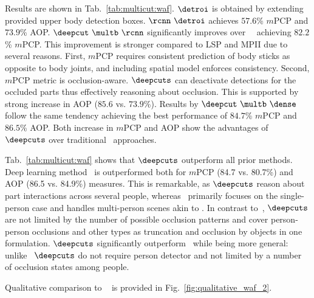

 Results are shown in
Tab.~\ref{tab:multicut:waf}. $\detroi$ is obtained by extending
provided upper body detection boxes.
$\rcnn~\detroi$ achieves $57.6$\% $m$PCP and $73.9$\%
AOP. $\deepcut~\multb~\rcnn$ significantly improves over
\rcnn~\detroi~achieving $82.2$\% $m$PCP. This improvement is stronger
compared to LSP and MPII due to several reasons. First, $m$PCP
requires consistent prediction of body sticks as opposite to body
joints, and including spatial model enforces consistency. Second,
$m$PCP metric is occlusion-aware. $\deepcuts$ can deactivate
detections for the occluded parts thus effectively reasoning about
occlusion. This is supported by strong increase in AOP ($85.6$
vs. $73.9$\%). Results by $\deepcut~\multb~\dense$ follow the same
tendency achieving the best performance of $84.7$\% $m$PCP and $86.5$\%
AOP. Both increase in $m$PCP and AOP show the advantages of
$\deepcuts$ over traditional \detroi~approaches.

Tab.~\ref{tab:multicut:waf} shows that 
$\deepcuts$ outperform all prior methods.
Deep learning method~\cite{Chen:2015:POC} is outperformed both for
$m$PCP (84.7 vs. 80.7\%) and AOP (86.5 vs. 84.9\%) measures. This is
remarkable, as $\deepcuts$ reason about part interactions across
several people, whereas~\cite{Chen:2015:POC} primarily focuses on the
single-person case and handles multi-person scenes akin to
\cite{yang12pami}. In contrast to~\cite{Chen:2015:POC}, $\deepcuts$
are not limited by the number of possible occlusion patterns and cover
person-person occlusions and other types as truncation and occlusion
by objects in one formulation. $\deepcuts$ significantly
outperform~\cite{eichner10eccv} while being more general:
unlike~\cite{eichner10eccv} $\deepcuts$ do not require person detector
and not limited by a number of occlusion states among people.

Qualitative comparison to ~\cite{Chen:2015:POC} is provided in
Fig.~\ref{fig:qualitative_waf_2}.


%

